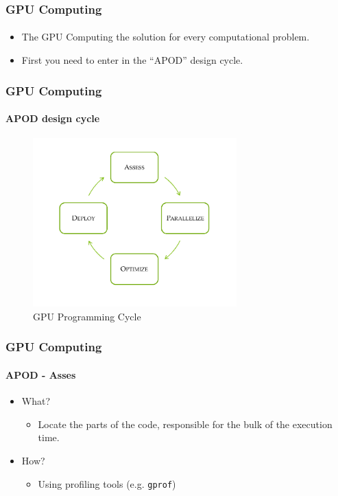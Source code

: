 \begin{frame}
    \frametitle{GPU Computing}
    \framesubtitle{}
    \begin{itemize}
        \item The GPU Computing  the solution for every computational problem.
        \item First you need to enter in the ``APOD'' design cycle.
    \end{itemize}
\end{frame}

\begin{frame}
    \frametitle{GPU Computing}
    \framesubtitle{APOD design cycle}
    \begin{figure}
        \centering
        \label{fig:apod}
        \includegraphics[width=0.7\textwidth]{img/apod}
        \caption{GPU Programming Cycle}
    \end{figure}
\end{frame}

\begin{frame}
    \frametitle{GPU Computing}
    \framesubtitle{APOD - Asses}
    \begin{itemize}
        \item What?
        \begin{itemize}
            \item Locate the parts of the code, responsible for the bulk of the execution time.
        \end{itemize}
        \item How?
        \begin{itemize}
            \item Using profiling tools (e.g. \texttt{gprof})
        \end{itemize}
    \end{itemize}
\end{frame}

